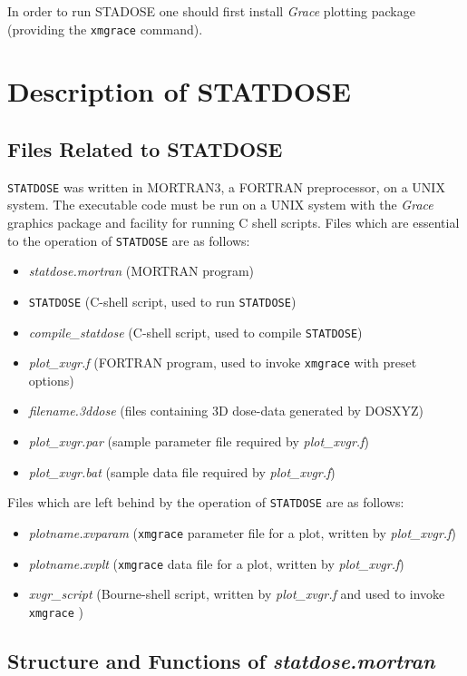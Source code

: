 \documentclass[12pt,twoside]{article}
\begin{document}
In order to run STADOSE one should first install {\em Grace} plotting
package (providing the {\tt xmgrace} command).

\section{Description of STATDOSE}

\subsection{Files Related to STATDOSE}
\verb+STATDOSE+ was written in MORTRAN3, a FORTRAN preprocessor, on a UNIX
system. The executable code must be run on a UNIX system with the {\em Grace}
graphics package and facility for running C shell scripts.
Files which are essential to the operation of \verb+STATDOSE+ are as
follows:

\begin{itemize}
\item {\em statdose.mortran} (MORTRAN program)
\item {\tt STATDOSE} (C-shell script, used to run \verb+STATDOSE+)
\item {\em compile\_statdose} (C-shell script, used to compile \verb+STATDOSE+)
\item {\em plot\_xvgr.f} (FORTRAN program, used to invoke {\tt xmgrace} with
preset options)
\item {\em filename.3ddose} (files containing 3D dose-data generated by DOSXYZ)
\item {\em plot\_xvgr.par} (sample parameter file required by  {\em plot\_xvgr.f})
\item {\em plot\_xvgr.bat} (sample data file required by {\em plot\_xvgr.f})
\end{itemize}
Files which are left behind by the operation of \verb+STATDOSE+ are as follows:
\begin {itemize}
\item {\em plotname.xvparam} ({\tt xmgrace}  parameter file for a plot,
written by {\em plot\_xvgr.f})
\item {\em plotname.xvplt} ({\tt xmgrace}  data file for a plot,
written by {\em plot\_xvgr.f})
\item {\em xvgr\_script} (Bourne-shell script, written by {\em plot\_xvgr.f}
and used to invoke {\tt xmgrace} )
\end{itemize}


\subsection{Structure and Functions of {\em statdose.mortran}}
\end{document}
